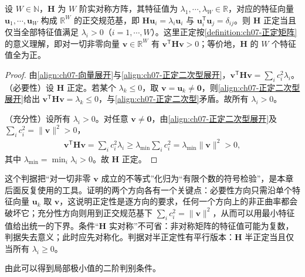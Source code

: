 \documentclass[../../main.tex]{subfiles}
\begin{document}
\begin{proposition}[正定性的特征值判据]\label{proposition:ch07-正定判据}
设 $W\in\mathbb{N}$，$\mathbf{H}$ 为 $W$ 阶实对称方阵，其特征值为 $\lambda_{1},\cdots,\lambda_{W}\in\mathbb{R}$，对应的特征向量 $\mathbf{u}_{1},\cdots,\mathbf{u}_{W}$ 构成 $\mathbb{R}^{W}$ 的正交规范基，即 $\mathbf{H}\mathbf{u}_{i}=\lambda_{i}\mathbf{u}_{i}$ 与 $\mathbf{u}_{i}^{\mathsf T}\mathbf{u}_{j}=\delta_{ij}$。则 $\mathbf{H}$ 正定当且仅当全部特征值满足 $\lambda_{i}>0$（$i=1,\cdots,W$）。这里正定按\cref{definition:ch07-正定矩阵}的意义理解，即对一切非零向量 $\mathbf{v}\in\mathbb{R}^{W}$ 有 $\mathbf{v}^{\mathsf T}\mathbf{H}\mathbf{v}>0$；等价地，$\mathbf{H}$ 的 $W$ 个特征值全为正。
\end{proposition}
\begin{proof}
由\eqref{align:ch07-向量展开}与\eqref{align:ch07-正定二次型展开}，$\mathbf{v}^{\mathsf T}\mathbf{H}\mathbf{v}=\sum_ic_i^{2}\lambda_i$。
（必要性）设 $\mathbf{H}$ 正定。若某个 $\lambda_k\leqslant0$，取 $\mathbf{v}=\mathbf{u}_k\neq\mathbf{0}$，则\eqref{align:ch07-正定二次型展开}给出 $\mathbf{v}^{\mathsf T}\mathbf{H}\mathbf{v}=\lambda_k\leqslant0$，与\eqref{align:ch07-正定二次型}矛盾。故所有 $\lambda_i>0$。

（充分性）设所有 $\lambda_i>0$。对任意 $\mathbf{v}\neq\mathbf{0}$，由\eqref{align:ch07-正定二次型展开}及 $\sum_ic_i^{2}=\|\mathbf{v}\|^{2}>0$，
\begin{align*}
\mathbf{v}^{\mathsf T}\mathbf{H}\mathbf{v} = \sum_i c_i^{2}\lambda_i \geqslant \lambda_{\min}\sum_i c_i^{2} = \lambda_{\min}\|\mathbf{v}\|^{2} > 0,
\end{align*}
其中 $\lambda_{\min}=\min_i\lambda_i>0$。故 $\mathbf{H}$ 正定。
\end{proof}

\begin{remark}
这个判据把“对一切非零 $\mathbf{v}$ 成立的不等式”化归为“有限个数的符号检验”，是本章后面反复使用的工具。证明的两个方向各有一个关键点：必要性方向只需沿单个特征向量 $\mathbf{u}_k$ 取 $\mathbf{v}$，这说明正定性是逐方向的要求，任何一个方向上的非正曲率都会破坏它；充分性方向则用到正交规范基下 $\sum_ic_i^{2}=\|\mathbf{v}\|^{2}$，从而可以用最小特征值给出统一的下界。条件“$\mathbf{H}$ 实对称”不可省：非对称矩阵的特征值可能为复数，判据失去意义；此时应先对称化。判据对半正定性有平行版本：$\mathbf{H}$ 半正定当且仅当所有 $\lambda_i\geqslant0$。
\end{remark}

由此可以得到局部极小值的二阶判别条件。
\end{document}

